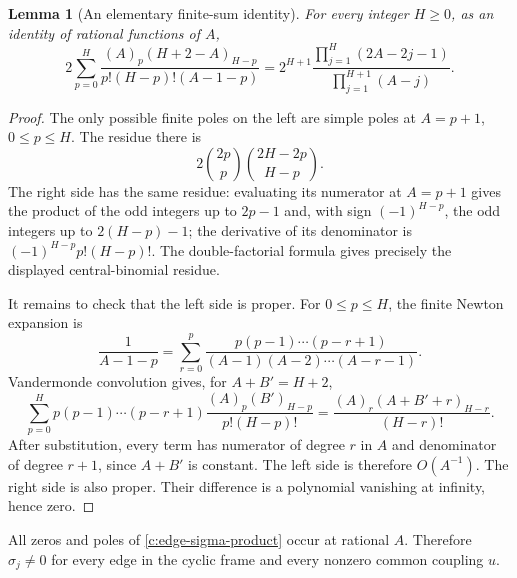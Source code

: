 \documentclass[11pt,a4paper]{article}
\numberwithin{equation}{section}
\newtheorem{lemma}[theorem]{Lemma}
\theoremstyle{definition}\newtheorem{definition}[theorem]{Definition}
\theoremstyle{remark}\newtheorem{remark}[theorem]{Remark}
\begin{document}
\begin{lemma}[An elementary finite-sum identity]
For every integer $H\geq0$, as an identity of rational functions of
$A$,
\begin{equation}\label{c:edge-sigma-product}
 2\sum_{p=0}^H
 \frac{(A)_p(H+2-A)_{H-p}}{p!(H-p)!(A-1-p)}
 =
 2^{H+1}\frac{\displaystyle\prod_{j=1}^H(2A-2j-1)}
                  {\displaystyle\prod_{j=1}^{H+1}(A-j)}.
\end{equation}
\end{lemma}
\begin{proof}
The only possible finite poles on the left are simple poles at
$A=p+1$, $0\leq p\leq H$.  The residue there is
\[
 2\binom{2p}{p}\binom{2H-2p}{H-p}.
\]
The right side has the same residue: evaluating its numerator at
$A=p+1$ gives the product of the odd integers up to $2p-1$ and,
with sign $(-1)^{H-p}$, the odd integers up to $2(H-p)-1$;
the derivative of its denominator is
$(-1)^{H-p}p!(H-p)!$.  The double-factorial formula gives precisely
the displayed central-binomial residue.

It remains to check that the left side is proper.  For $0\leq p\leq H$,
the finite Newton expansion is
\[
 \frac1{A-1-p}
 =\sum_{r=0}^p
 \frac{p(p-1)\cdots(p-r+1)}{(A-1)(A-2)\cdots(A-r-1)}.
\]
Vandermonde convolution gives, for $A+B'=H+2$,
\[
 \sum_{p=0}^H p(p-1)\cdots(p-r+1)
       \frac{(A)_p(B')_{H-p}}{p!(H-p)!}
 =\frac{(A)_r(A+B'+r)_{H-r}}{(H-r)!}.
\]
After substitution, every term has numerator of degree $r$ in $A$
and denominator of degree $r+1$, since $A+B'$ is constant.  The
left side is therefore $O(A^{-1})$.  The right side is also proper.
Their difference is a polynomial vanishing at infinity, hence zero.
\end{proof}

All zeros and poles of \eqref{c:edge-sigma-product} occur at rational
$A$.  Therefore $\sigma_j\ne0$ for every edge in the cyclic
frame and every nonzero common coupling $u$.
\end{document}
